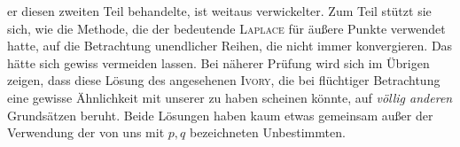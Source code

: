 er diesen zweiten Teil behandelte, ist weitaus verwickelter. Zum Teil stützt sie sich, wie die Methode, die der bedeutende \textsc{Laplace} für äußere Punkte verwendet hatte, auf die Betrachtung unendlicher Reihen, die nicht immer konvergieren. Das hätte sich gewiss vermeiden lassen. Bei näherer Prüfung wird sich im Übrigen zeigen, dass diese Lösung des angesehenen \textsc{Ivory}, die bei flüchtiger Betrachtung eine gewisse Ähnlichkeit mit unserer zu haben scheinen könnte, auf \textit{völlig anderen} Grundsätzen beruht. Beide Lösungen haben kaum etwas gemeinsam außer der Verwendung der von uns mit $p,q$ bezeichneten Unbestimmten.
